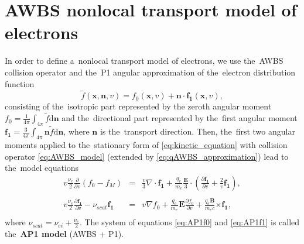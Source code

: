 \documentclass[
 aps,
 jmp,
 amsmath,amssymb,
 twocolumn,
]{revtex4-1}
\newcommand{\pdv}[2]{\frac{\partial{#1}}{\partial{#2}}}
\newcommand{\vect}[1]{\boldsymbol{#1}}
\newcommand{\dI}{\text{d}}
\newcommand{\nue}{\nu_{e}}
\newcommand{\nuei}{\nu_{ei}}
\newcommand{\nuscat}{\nu_{scat}}
\newcommand{\vmag}{v}
\newcommand{\vn}{\vect{n}}
\newcommand{\E}{\vect{E}}
\newcommand{\B}{\vect{B}}
\newcommand{\qe}{q_e}
\newcommand{\me}{m_e}
\newcommand{\fM}{f_M}
\newcommand{\fzero}{f_0}
\newcommand{\fone}{{\vect{f_1}}}
\newcommand{\ft}{f}
\begin{document}
\section{AWBS nonlocal transport model of electrons}
\label{sec:AWBSnonlocal}

In order to define a~nonlocal transport model of electrons, 
we use the~AWBS collision operator and the~P1 angular 
approximation of the~electron distribution function
\begin{equation}
  \tilde{\ft}(\vect{x}, \vn, \vmag) = 
  \fzero(\vect{x}, \vmag) + \vn\cdot\fone(\vect{x}, \vmag) , 
  \label{eq:P1approximation}
\end{equation}
consisting of the~isotropic part represented by the zeroth angular moment 
$\fzero = \frac{1}{4\pi}\int_{4\pi} \tilde{\ft} \dI\vn$ 
and the~directional part represented by the~first angular moment 
$\fone = \frac{3}{4\pi}\int_{4\pi} \vn
\tilde{\ft} \dI\vn$, where $\vn$ is the~transport direction.
Then, the~first two angular moments
\cite{Shkarofsky_Particle_Kinetics_book_1966_24} applied to the~stationary 
form of 
\eqref{eq:kinetic_equation} with collision operator \eqref{eq:AWBS_model} 
(extended by \eqref{eq:qAWBS_approximation}) lead to the~model equations
\begin{eqnarray}
  \vmag\frac{\nue}{2}\pdv{}{\vmag}\left(\fzero - \fM \right) &=&
  \frac{\vmag}{3}\nabla\cdot\fone + \frac{\qe}{\me}\frac{\E}{3}\cdot\left(
  \pdv{\fone}{\vmag} + \frac{2}{\vmag}\fone\right) , 
  \nonumber \\
  \label{eq:AP1f0}\\
  \vmag\frac{\nue}{2}\pdv{\fone}{\vmag}
  - \nuscat\fone &=& 
  \vmag\nabla\fzero + 
  \frac{\qe}{\me}\E\pdv{\fzero}{\vmag} 
  +\frac{\qe\B}{\me c}\vect{\times} \fone
  ,
  \nonumber \\
  \label{eq:AP1f1}
\end{eqnarray}
where $\nuscat = \nuei + \frac{\nue}{2}$. The system of equations 
\eqref{eq:AP1f0} and \eqref{eq:AP1f1} is called the~{\bf AP1 model} 
(AWBS + P1).  
\end{document}
